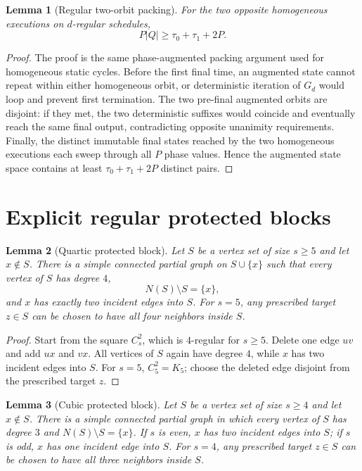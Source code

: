 \documentclass[11pt]{article}
\newtheorem{lemma}{Lemma}
\theoremstyle{remark}
\begin{document}
\begin{lemma}[Regular two-orbit packing]
For the two opposite homogeneous executions on $d$-regular schedules,
\[
P|Q|\ge \tau_0+\tau_1+2P.
\]
\end{lemma}

\begin{proof}
The proof is the same phase-augmented packing argument used for homogeneous static
cycles.  Before the first final time, an augmented state cannot repeat within either
homogeneous orbit, or deterministic iteration of $G_d$ would loop and prevent first
termination.  The two pre-final augmented orbits are disjoint: if they met, the two
deterministic suffixes would coincide and eventually reach the same final output,
contradicting opposite unanimity requirements.  Finally, the distinct immutable
final states reached by the two homogeneous executions each sweep through all $P$
phase values.  Hence the augmented state space contains at least
$\tau_0+\tau_1+2P$ distinct pairs.
\end{proof}

\section{Explicit regular protected blocks}

\begin{lemma}[Quartic protected block]
Let $S$ be a vertex set of size $s\ge5$ and let $x\notin S$.  There is a simple
connected partial graph on $S\cup\{x\}$ such that every vertex of $S$ has degree $4$,
\[
N(S)\setminus S=\{x\},
\]
and $x$ has exactly two incident edges into $S$.
For $s=5$, any prescribed target $z\in S$ can be chosen to have all four neighbors
inside $S$.
\end{lemma}

\begin{proof}
Start from the square $C_s^2$, which is $4$-regular for $s\ge5$.
Delete one edge $uv$ and add $ux$ and $vx$.  All vertices of $S$ again have degree
$4$, while $x$ has two incident edges into $S$.  For $s=5$, $C_5^2=K_5$; choose
the deleted edge disjoint from the prescribed target $z$.
\end{proof}

\begin{lemma}[Cubic protected block]
Let $S$ be a vertex set of size $s\ge4$ and let $x\notin S$.
There is a simple connected partial graph in which every vertex of $S$ has degree $3$
and $N(S)\setminus S=\{x\}$.  If $s$ is even, $x$ has two incident edges into $S$;
if $s$ is odd, $x$ has one incident edge into $S$.
For $s=4$, any prescribed target $z\in S$ can be chosen to have all three neighbors
inside $S$.
\end{lemma}
\end{document}
